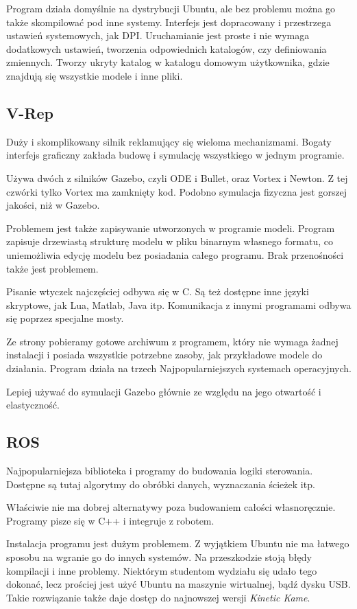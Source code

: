 Program działa domyślnie na dystrybucji Ubuntu, ale bez problemu można go także skompilować pod inne systemy.
Interfejs jest dopracowany i przestrzega ustawień systemowych, jak DPI.
Uruchamianie jest proste i nie wymaga dodatkowych ustawień, tworzenia odpowiednich katalogów, czy definiowania zmiennych.
Tworzy ukryty katalog w katalogu domowym użytkownika, gdzie znajdują się wszystkie modele i inne pliki.

\subsection{V-Rep}
Duży i skomplikowany silnik reklamujący się wieloma mechanizmami.
Bogaty interfejs graficzny zakłada budowę i symulację wszystkiego w jednym programie.

Używa dwóch z silników Gazebo, czyli ODE i Bullet, oraz Vortex i Newton. Z tej czwórki tylko Vortex ma zamknięty kod.
Podobno symulacja fizyczna jest gorszej jakości, niż w Gazebo.

Problemem jest także zapisywanie utworzonych w programie modeli.
Program zapisuje drzewiastą strukturę modelu w pliku binarnym własnego formatu, co uniemożliwia edycję modelu bez posiadania całego programu.
Brak przenośności także jest problemem.

Pisanie wtyczek najczęściej odbywa się w C. Są też dostępne inne języki skryptowe, jak Lua, Matlab, Java itp.
Komunikacja z innymi programami odbywa się poprzez specjalne mosty.

Ze strony pobieramy gotowe archiwum z programem, który nie wymaga żadnej instalacji i posiada wszystkie potrzebne zasoby, jak przykładowe modele do działania.
Program działa na trzech Najpopularniejszych systemach operacyjnych.

Lepiej używać do symulacji Gazebo głównie ze względu na jego otwartość i elastyczność.

\subsection{ROS}
Najpopularniejsza biblioteka i programy do budowania logiki sterowania.
Dostępne są tutaj algorytmy do obróbki danych, wyznaczania ścieżek itp.

Właściwie nie ma dobrej alternatywy poza budowaniem całości własnoręcznie.
Programy pisze się w C++ i integruje z robotem.

Instalacja programu jest dużym problemem.
Z wyjątkiem Ubuntu nie ma łatwego sposobu na wgranie go do innych systemów.
Na przeszkodzie stoją błędy kompilacji i inne problemy. Niektórym studentom wydziału się udało tego dokonać, lecz prościej jest użyć Ubuntu na maszynie wirtualnej, bądź dysku USB.
Takie rozwiązanie także daje dostęp do najnowszej wersji \emph{Kinetic Kame}.

